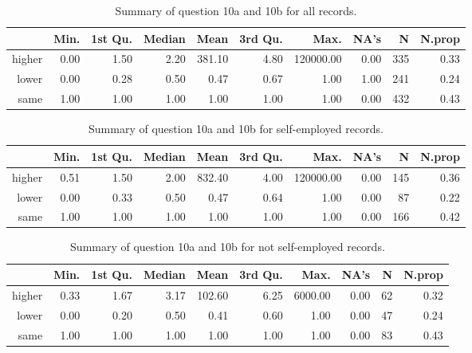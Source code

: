 \begin{table}[ht]
\footnotesize
\centering
\begin{tabular}{rrrrrrrrrr}
  \hline
 & Min. & 1st Qu. & Median & Mean & 3rd Qu. & Max. & NA's & N & N.prop \\ 
  \hline
higher & 0.00 & 1.50 & 2.20 & 381.10 & 4.80 & 120000.00 & 0.00 & 335 & 0.33 \\ 
  lower & 0.00 & 0.28 & 0.50 & 0.47 & 0.67 & 1.00 & 1.00 & 241 & 0.24 \\ 
  same & 1.00 & 1.00 & 1.00 & 1.00 & 1.00 & 1.00 & 0.00 & 432 & 0.43 \\ 
   \hline
\end{tabular}
\caption{\label{tab:BC_all}  Summary of question 10a and 10b for  all records.}
\end{table}

\begin{table}[ht]
\footnotesize
\centering
\begin{tabular}{rrrrrrrrrr}
  \hline
 & Min. & 1st Qu. & Median & Mean & 3rd Qu. & Max. & NA's & N & N.prop \\ 
  \hline
higher & 0.51 & 1.50 & 2.00 & 832.40 & 4.00 & 120000.00 & 0.00 & 145 & 0.36 \\ 
  lower & 0.00 & 0.33 & 0.50 & 0.47 & 0.64 & 1.00 & 0.00 &  87 & 0.22 \\ 
  same & 1.00 & 1.00 & 1.00 & 1.00 & 1.00 & 1.00 & 0.00 & 166 & 0.42 \\ 
   \hline
\end{tabular}
\caption{\label{tab:BC_se}  Summary of question 10a and 10b for  self-employed records.}
\end{table}

\begin{table}[ht]
\footnotesize
\centering
\begin{tabular}{rrrrrrrrrr}
  \hline
 & Min. & 1st Qu. & Median & Mean & 3rd Qu. & Max. & NA's & N & N.prop \\ 
  \hline
higher & 0.33 & 1.67 & 3.17 & 102.60 & 6.25 & 6000.00 & 0.00 &  62 & 0.32 \\ 
  lower & 0.00 & 0.20 & 0.50 & 0.41 & 0.60 & 1.00 & 0.00 &  47 & 0.24 \\ 
  same & 1.00 & 1.00 & 1.00 & 1.00 & 1.00 & 1.00 & 0.00 &  83 & 0.43 \\ 
   \hline
\end{tabular}
\caption{\label{tab:BC_nse}  Summary of question 10a and 10b for  not self-employed records.}
\end{table}


